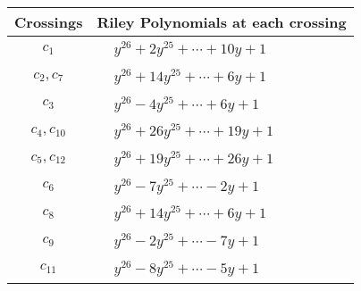 \documentclass[1p]{elsarticle_modified}
\theoremstyle{definition}
\begin{document}
\begin{tabular}{m{50pt}|m{274pt}}
Crossings & \hspace{64pt}Riley Polynomials at each crossing \\
\hline $$\begin{aligned}c_{1}\end{aligned}$$&$\begin{aligned}
&y^{26}+2 y^{25}+\cdots+10 y+1
\end{aligned}$\\
\hline $$\begin{aligned}c_{2},c_{7}\end{aligned}$$&$\begin{aligned}
&y^{26}+14 y^{25}+\cdots+6 y+1
\end{aligned}$\\
\hline $$\begin{aligned}c_{3}\end{aligned}$$&$\begin{aligned}
&y^{26}-4 y^{25}+\cdots+6 y+1
\end{aligned}$\\
\hline $$\begin{aligned}c_{4},c_{10}\end{aligned}$$&$\begin{aligned}
&y^{26}+26 y^{25}+\cdots+19 y+1
\end{aligned}$\\
\hline $$\begin{aligned}c_{5},c_{12}\end{aligned}$$&$\begin{aligned}
&y^{26}+19 y^{25}+\cdots+26 y+1
\end{aligned}$\\
\hline $$\begin{aligned}c_{6}\end{aligned}$$&$\begin{aligned}
&y^{26}-7 y^{25}+\cdots-2 y+1
\end{aligned}$\\
\hline $$\begin{aligned}c_{8}\end{aligned}$$&$\begin{aligned}
&y^{26}+14 y^{25}+\cdots+6 y+1
\end{aligned}$\\
\hline $$\begin{aligned}c_{9}\end{aligned}$$&$\begin{aligned}
&y^{26}-2 y^{25}+\cdots-7 y+1
\end{aligned}$\\
\hline $$\begin{aligned}c_{11}\end{aligned}$$&$\begin{aligned}
&y^{26}-8 y^{25}+\cdots-5 y+1
\end{aligned}$\\
\hline
\end{tabular}\\~\\
\end{document}
